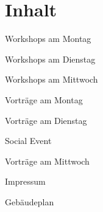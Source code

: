 \section*{Inhalt}

\vspace*{0.35em}%
\noindent Workshops am Montag \dotfill \pageref{montag-workshops}

\vspace*{0.35em}%
\noindent Workshops am Dienstag \dotfill \pageref{dienstag-workshops}

\vspace*{0.35em}%
\noindent Workshops am Mittwoch \dotfill %

\vspace*{0.35em}%
\noindent Vorträge am Montag \dotfill %

\vspace*{0.35em}%
\noindent Vorträge am Dienstag \dotfill %

\vspace*{0.35em}%
\noindent Social Event \dotfill %

\vspace*{0.35em}%
\noindent Vorträge am Mittwoch %

\vspace*{0.35em}%
\noindent Impressum \dotfill %

\vspace*{0.35em}%
\noindent Gebäudeplan \dotfill %
